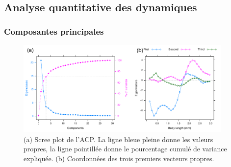 {\begin{longtable}
\end{longtable}
}

\subsection{Analyse quantitative des dynamiques}

\subsubsection{Composantes principales}

\begin{figure}[!ht]
\begin{center}
\includegraphics[width=0.95\textwidth]{1_CorpsDeThese/Resumes/Fig/SP02}
\caption[Composantes
principales]{(a) Scree plot de l'ACP. La ligne bleue pleine donne les valeurs
propres, la ligne pointillée donne le pourcentage cumulé de variance expliquée.
(b) Coordonnées des trois premiers vecteurs propres.}
\label{fig:SP2}
\end{center}
\end{figure}

